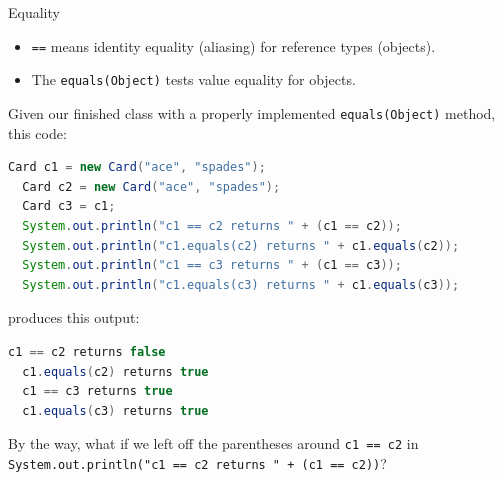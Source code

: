 \documentclass{beamer}
\begin{document}
\begin{frame}[fragile]{Equality}
\vspace{-.05in}
\begin{itemize}
\item {\tt ==} means identity equality (aliasing) for reference types (objects).
\item The {\tt equals(Object)} tests value equality for objects.
\end{itemize}

Given our finished  class with a properly implemented {\tt equals(Object)} method, this code:
\vspace{-.05in}
\begin{lstlisting}[language=Java]
  Card c1 = new Card("ace", "spades");
  Card c2 = new Card("ace", "spades");
  Card c3 = c1;
  System.out.println("c1 == c2 returns " + (c1 == c2));
  System.out.println("c1.equals(c2) returns " + c1.equals(c2));
  System.out.println("c1 == c3 returns " + (c1 == c3));
  System.out.println("c1.equals(c3) returns " + c1.equals(c3));
\end{lstlisting}
\vspace{-.05in}
produces this output:
\vspace{-.05in}
\begin{lstlisting}[language=Java]
  c1 == c2 returns false
  c1.equals(c2) returns true
  c1 == c3 returns true
  c1.equals(c3) returns true
\end{lstlisting}
\vspace{-.05in}
{\small By the way, what if we left off the parentheses around {\tt c1 == c2} in  {\tt System.out.println("c1 == c2 returns " + (c1 == c2))}}?
\end{frame}










\end{document}
